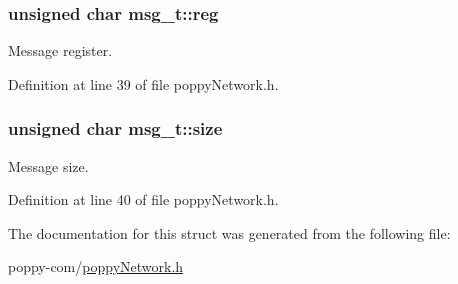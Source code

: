 \hypertarget{structmsg__t_a0aef01fbaf575c639d82d5beee92c421}{
\subsubsection[{reg}]{\setlength{\rightskip}{0pt plus 5cm}unsigned char msg\-\_\-t\-::reg}}\label{structmsg__t_a0aef01fbaf575c639d82d5beee92c421}
Message register. 

Definition at line 39 of file poppy\-Network.\-h.

\hypertarget{structmsg__t_a3736f2ca203e665223b225ca07def9b5}{
\subsubsection[{size}]{\setlength{\rightskip}{0pt plus 5cm}unsigned char msg\-\_\-t\-::size}}\label{structmsg__t_a3736f2ca203e665223b225ca07def9b5}
Message size. 

Definition at line 40 of file poppy\-Network.\-h.



The documentation for this struct was generated from the following file\-:\begin{DoxyCompactItemize}
\item 
poppy-\/com/\hyperlink{poppy_network_8h}{poppy\-Network.\-h}\end{DoxyCompactItemize}
